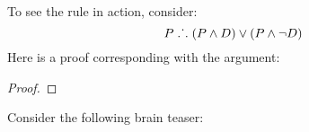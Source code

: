 %
%
%
%
%

To see the rule in action, consider:
$$P \mathrel{\ldotp\dot{}\,\ldotp} (P \wedge D) \vee (P \wedge \neg D)$$
Here is a proof corresponding with the argument:
\begin{proof}
	\LEM
	\open
	\close
	\open
	\close
\end{proof}

Consider the following brain teaser:

